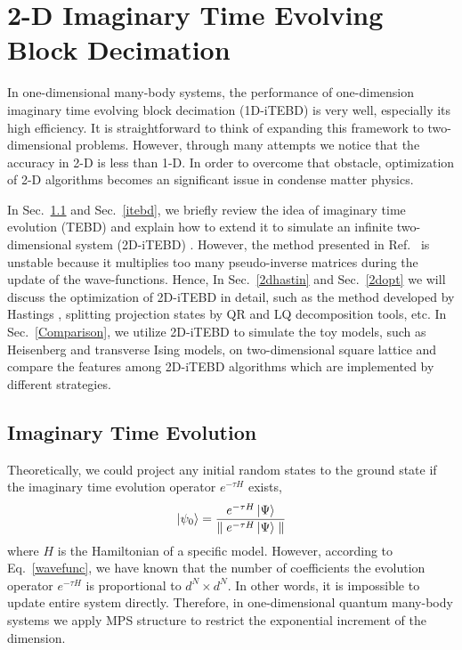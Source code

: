 \chapter{2-D Imaginary Time Evolving Block Decimation}
\label{chapter:2ditebd}

In one-dimensional many-body systems, the performance of one-dimension imaginary time evolving block decimation (1D-iTEBD) is very well, especially its high efficiency. It is straightforward to think of expanding this framework to two-dimensional problems. However, through many attempts we notice that the accuracy in 2-D is less than 1-D. In order to overcome that obstacle, optimization of 2-D algorithms becomes an significant issue in condense matter physics. 

In Sec.~\ref{ite} and Sec.~\ref{itebd}, we briefly review the idea of imaginary time evolution (TEBD) \cite{PhysRevLett.93.040502} \cite{PhysRevB.78.155117} and explain how to extend it to simulate an infinite two-dimensional system (2D-iTEBD) \cite{PhysRevB.86.195137}. However, the method presented in Ref.~\cite{PhysRevB.86.195137} is unstable because it multiplies too many pseudo-inverse matrices during the update of the wave-functions. Hence, In Sec.~\ref{2dhastin} and Sec.~\ref{2dopt} we will discuss the optimization of 2D-iTEBD in detail, such as the method developed by Hastings \cite{light_hastings}, splitting projection states by QR and LQ decomposition tools, etc. In Sec.~\ref{Comparison}, we utilize 2D-iTEBD to simulate the toy models, such as Heisenberg and transverse Ising models, on two-dimensional square lattice and compare the features among 2D-iTEBD algorithms which are implemented by different strategies.

\section{Imaginary Time Evolution}
\label{ite}
Theoretically, we could project any initial random states to the ground state if the imaginary time evolution operator $e^{-\tau H}$ exists,  
\begin{align}
	\label{mapgroud}
	\Ket{\psi_0} = \frac{e^{-\tau H} \Ket{\Psi}}{\parallel e^{-\tau H} \Ket{\Psi}\parallel}
\end{align}
where $H$ is the Hamiltonian of a specific model. However, according to Eq.~\ref{wavefunc}, we have known that the number of coefficients the evolution operator $e^{-\tau H}$ is proportional to $d^N \times d^N$. In other words, it is impossible to update entire system directly. Therefore, in one-dimensional quantum many-body systems we apply MPS structure to restrict the exponential increment of the dimension. 

